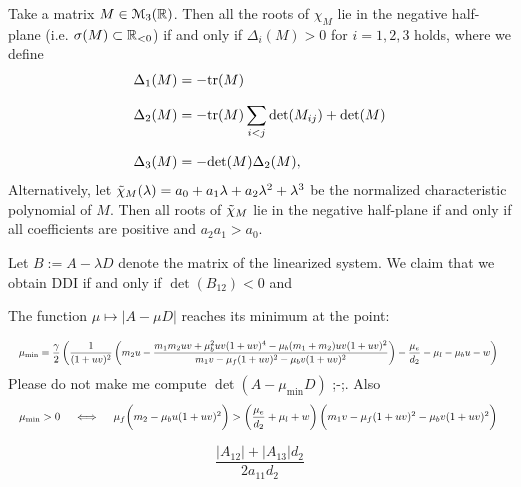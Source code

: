 \begin{theorem}
	Take a matrix $M \in \EuScript{M}_3(\mathbb{R})$. Then all the roots of $\chi_M$ lie in the negative half-plane (i.e. $\sigma(M) \subset \mathbb{R}_{<0}$) if and only if
	$\Delta_i(M) > 0$ for $i=1, 2, 3$ holds, where we define
	\begin{align*}
		\Delta_1(M) &= -\mathrm{tr}(M) \\[0.7em]
		\Delta_2(M) &= -\mathrm{tr}(M) \sum_{i < j} \mathrm{det}(M_{ij}) + \mathrm{det}(M) \\[0.7em]
		\Delta_3(M) &= -\mathrm{det}(M) \Delta_2(M),
	\end{align*}
Alternatively, let $\Tilde{\chi}_{M}(\lambda) = a_0 + a_1 \lambda + a_2 \lambda^2 + \lambda^3$ be the normalized characteristic polynomial of $M$. Then all roots of $\Tilde{\chi}_M$ lie in the negative half-plane if and only if all coefficients are positive and $a_2 a_1 > a_0$.
\end{theorem}


\begin{lemma} Let $B := A - \lambda D$ denote the matrix of the linearized system. We claim that we obtain DDI if and only if $\det(B_{12}) < 0$ and 
	
\end{lemma}


\begin{remark}[Minimum] The function $\mu \longmapsto |A - \mu D|$ reaches its minimum at the point:
	
\begin{equation}
	\resizebox{\hsize}{!}{%
		$\mu_{\mathbf{\mathrm{min}}} = \dfrac{\gamma}{2}\left( \dfrac{1}{(1+uv)^2}\left( m_2 u -  \dfrac{m_1m_2uv + \mu_b^2 uv(1+uv)^4 - \mu_b(m_1 + m_2) uv(1+uv)^2}{m_1 v - \mu_f (1 + uv)^2 - \mu_b v(1+uv)^2} \right)-\dfrac{\mu_e}{d_2} - \mu_l - \mu_b u - w\right) \notag$  
	}
\end{equation}
Please do not make me compute $\det(A - \mu_{\textrm{min}} D)$ ;-;. Also
\begin{equation}
	\resizebox{\hsize}{!}{%
		$\mu_{\mathbf{\mathrm{min}}} > 0 \quad \iff\quad \mu_f \biggl(m_2 - \mu_b u (1 + uv)^2\biggr) > \left( \dfrac{\mu_e}{d_2} + \mu_l + w \right) \biggl( m_1 v - \mu_f(1+uv)^2 - \mu_b v (1 + uv)^2\biggr) \notag$  
	}
\end{equation}
\end{remark}



$$\frac{|A_{12}| + |A_{13}|d_2}{2a_{11} d_2}$$


